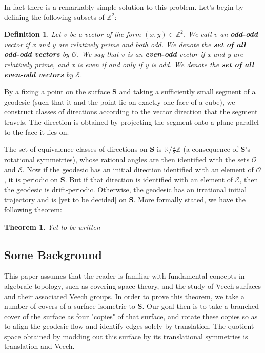 \documentclass[]{article}
\newtheorem*{thm*}{Theorem}
\newtheorem*{def*}{Definition}
\begin{document}
In fact there is a remarkably simple solution to this problem. Let's begin by defining the following subsets of $\mathbb{Z}^2$:

\begin{def*}
Let $v$ be a vector of the form $(x,y)\in\mathbb{Z}^{2}$. We call $v$ an \textbf{odd-odd} vector if x and y are relatively prime and both odd. We denote the \textbf{set of all odd-odd vectors} by $\mathcal{O}$. We say that $v$ is an  \textbf{even-odd} vector if x and y are relatively prime, and x is even if and only if y is odd. We denote the \textbf{set of all even-odd vectors} by $\mathcal{E}$.
\end{def*}

By a fixing a point on the surface $\mathbf S$ and taking a sufficiently small segment of a geodesic (such that it and the point lie on exactly one face of a cube), we construct classes of directions according to the vector direction that the segment travels. The direction is obtained by projecting the segment onto a plane parallel to the face it lies on.

\begin{figure}[H]
\centering

\end{figure}

The set of equivalence classes of directions on $\mathbf S$ is $\mathbb R/\frac{\pi}{2}\mathbb Z$ (a consequence of $\mathbf S$'s rotational symmetries), whose rational angles are then identified with the sets $\mathcal{O}$ and $\mathcal{E}$. Now if the geodesic has an initial direction identified with an element of $\mathcal{O}$, it is periodic on $\mathbf S$. But if that direction is identified with an element of $\mathcal{E}$, then the geodesic is drift-periodic. Otherwise, the geodesic has an irrational initial trajectory and is [yet to be decided] on $\mathbf S$. More formally stated, we have the following theorem:

\begin{thm*}
Yet to be written
\end{thm*}

\subsection{Some Background}
This paper assumes that the reader is familiar with fundamental concepts in algebraic topology, such as covering space theory, and the study of Veech surfaces and their associated Veech groups. In order to prove this theorem, we take a number of covers of a surface isometric to $\mathbf S$. Our goal then is to take a branched cover of the surface as four "copies" of that surface, and rotate these copies so as to align the geodesic flow and identify edges solely by translation. The quotient space obtained by modding out this surface by its translational symmetries is translation and Veech.
\end{document}
